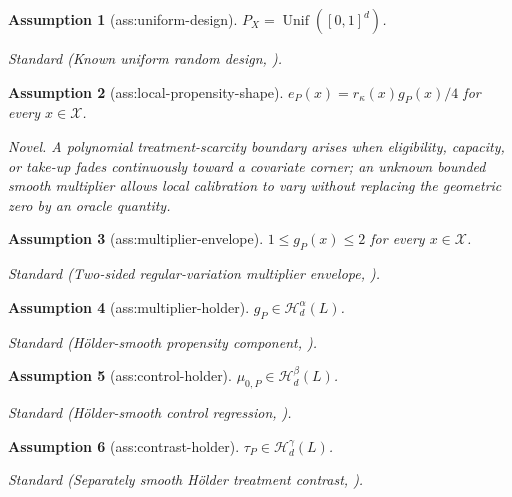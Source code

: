 \documentclass{article}
\newtheorem{assumption}{Assumption}
\begin{document}
\begin{assumption}[ass:uniform-design]\label{ass:uniform-design}
\(P_X=\operatorname{Unif}([0,1]^d)\).
\par\smallskip\noindent\emph{Standard} (Known uniform random design, \cite{GaoHan2020}).
\end{assumption}

\begin{assumption}[ass:local-propensity-shape]\label{ass:local-propensity-shape}
\(e_P(x)=r_{\kappa}(x)g_P(x)/4\) for every \(x\in\mathcal X\).
\par\smallskip\noindent\emph{Novel.} A polynomial treatment-scarcity boundary arises when eligibility, capacity, or take-up fades continuously toward a covariate corner; an unknown bounded smooth multiplier allows local calibration to vary without replacing the geometric zero by an oracle quantity.
\end{assumption}

\begin{assumption}[ass:multiplier-envelope]\label{ass:multiplier-envelope}
\(1\le g_P(x)\le2\) for every \(x\in\mathcal X\).
\par\smallskip\noindent\emph{Standard} (Two-sided regular-variation multiplier envelope, \cite{Gaiffas2005DegenerateDesign}).
\end{assumption}

\begin{assumption}[ass:multiplier-holder]\label{ass:multiplier-holder}
\(g_P\in\mathcal H_d^{\alpha}(L)\).
\par\smallskip\noindent\emph{Standard} (H\"older-smooth propensity component, \cite{KennedyBalakrishnanRobinsWasserman2024MinimaxCATE}).
\end{assumption}

\begin{assumption}[ass:control-holder]\label{ass:control-holder}
\(\mu_{0,P}\in\mathcal H_d^{\beta}(L)\).
\par\smallskip\noindent\emph{Standard} (H\"older-smooth control regression, \cite{KennedyBalakrishnanRobinsWasserman2024MinimaxCATE}).
\end{assumption}

\begin{assumption}[ass:contrast-holder]\label{ass:contrast-holder}
\(\tau_P\in\mathcal H_d^{\gamma}(L)\).
\par\smallskip\noindent\emph{Standard} (Separately smooth H\"older treatment contrast, \cite{KennedyBalakrishnanRobinsWasserman2024MinimaxCATE}).
\end{assumption}
\end{document}
